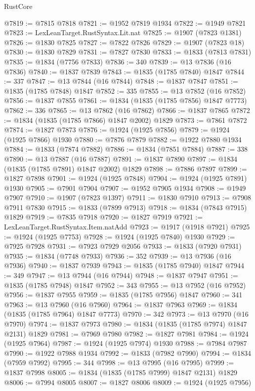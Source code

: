 \begin{lexlean}{RustCore}
\begin{coremodule}
@7819 := @7815 @7818
@7821 := @1952 @7819 @1934
@7822 := @1949 @7821
@7823 := LexLeanTarget.RustSyntax.Lit.nat
@7825 := @1907 (@7823 @1381)
@7826 := @1830 @7825
@7827 := @7822 @7826
@7829 := @1907 (@7823 @18)
@7830 := @1830 @7829
@7831 := @7827 @7830
@7833 := @1833 (@7813 @7831)
@7835 := @1834 (@7756 @7833)
@7836 := 340
@7839 := @13 @7836 (@16 @7836)
@7840 := @1837 @7839
@7843 := @1835 (@1785 @7840) @1847
@7844 := 337
@7847 := @13 @7844 (@16 @7844)
@7848 := @1837 @7847
@7851 := @1835 (@1785 @7848) @1847
@7852 := 335
@7855 := @13 @7852 (@16 @7852)
@7856 := @1837 @7855
@7861 := @1834 (@1835 (@1785 @7856) @1847 @7773)
@7862 := 336
@7865 := @13 @7862 (@16 @7862)
@7866 := @1837 @7865
@7872 := @1834 (@1835 (@1785 @7866) @1847 @2002) @1829
@7873 := @7861 @7872
@7874 := @1827 @7873
@7876 := @1924 (@1925 @7856)
@7879 := @1924 (@1925 @7866) @1930
@7880 := @7876 @7879
@7882 := @1922 @7880 @1934
@7884 := @1833 (@7874 @7882)
@7886 := @1834 (@7851 @7884)
@7887 := 338
@7890 := @13 @7887 (@16 @7887)
@7891 := @1837 @7890
@7897 := @1834 (@1835 (@1785 @7891) @1847 @2002) @1829
@7898 := @7886 @7897
@7899 := @1827 @7898
@7901 := @1924 (@1925 @7848)
@7904 := @1924 (@1925 @7891) @1930
@7905 := @7901 @7904
@7907 := @1952 @7905 @1934
@7908 := @1949 @7907
@7910 := @1907 (@7823 @1397)
@7911 := @1830 @7910
@7913 := @7908 @7911 @7830
@7915 := @1833 (@7899 @7913)
@7918 := @1834 (@7843 @7915) @1829
@7919 := @7835 @7918
@7920 := @1827 @7919
@7921 := LexLeanTarget.RustSyntax.Item.natAdd
@7923 := @1917 (@1918 @7921)
@7925 := @1924 (@1925 @7753)
@7928 := @1924 (@1925 @7840) @1930
@7929 := @7925 @7928
@7931 := @7923 @7929 @2056
@7933 := @1833 (@7920 @7931)
@7935 := @1834 (@7748 @7933)
@7936 := 352
@7939 := @13 @7936 (@16 @7936)
@7940 := @1837 @7939
@7943 := @1835 (@1785 @7940) @1847
@7944 := 349
@7947 := @13 @7944 (@16 @7944)
@7948 := @1837 @7947
@7951 := @1835 (@1785 @7948) @1847
@7952 := 343
@7955 := @13 @7952 (@16 @7952)
@7956 := @1837 @7955
@7959 := @1835 (@1785 @7956) @1847
@7960 := 341
@7963 := @13 @7960 (@16 @7960)
@7964 := @1837 @7963
@7969 := @1834 (@1835 (@1785 @7964) @1847 @7773)
@7970 := 342
@7973 := @13 @7970 (@16 @7970)
@7974 := @1837 @7973
@7980 := @1834 (@1835 (@1785 @7974) @1847 @2131) @1829
@7981 := @7969 @7980
@7982 := @1827 @7981
@7984 := @1924 (@1925 @7964)
@7987 := @1924 (@1925 @7974) @1930
@7988 := @7984 @7987
@7990 := @1922 @7988 @1934
@7992 := @1833 (@7982 @7990)
@7994 := @1834 (@7959 @7992)
@7995 := 344
@7998 := @13 @7995 (@16 @7995)
@7999 := @1837 @7998
@8005 := @1834 (@1835 (@1785 @7999) @1847 @2131) @1829
@8006 := @7994 @8005
@8007 := @1827 @8006
@8009 := @1924 (@1925 @7956)

\end{coremodule}
\end{lexlean}
